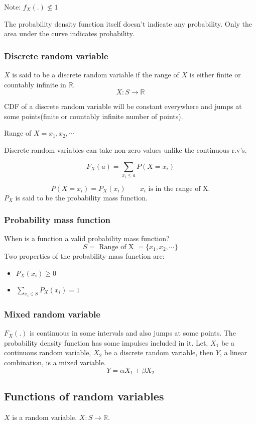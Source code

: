 \documentclass{article}
\begin{document}
Note: $f_X(.) \nleq 1$

The probability density function itself doesn't indicate any probability.
Only the area under the curve indicates probability.

\subsubsection{Discrete random variable}

$X$ is said to be a discrete random variable if the range of $X$ is either finite or countably infinite in $\mathbb{R}$.
$$ X:S \to \mathbb{R}$$

CDF of a discrete random variable will be constant everywhere and jumps at some points(finite or countably infinite number of points).

Range of $X={x_1,x_2,\cdots}$

Discrete random variables can take non-zero values unlike the continuous r.v's.

$$ F_X(a)= \sum_{x_i \leq a}P(X= x_i)$$

$$ P(X=x_i)= P_X(x_i)\qquad x_i \text{ is in the range of X.}$$
$P_X$ is said to be the probability mass function.

\subsubsection{Probability mass function}
When is a function a valid probability mass function?
$$ S= \text{ Range of X }= \{ x_1, x_2, \cdots\}$$
Two properties of the probability mass function are:
\begin{itemize}
    \item $P_X(x_i) \geq 0$

    \item $ \sum_{x_i \in S}P_X(x_i)=1$
\end{itemize}

\subsubsection{Mixed random variable}

$F_X(.)$ is continuous in some intervals and also jumps at some points. The probability density function has some impulses included in it. Let, $X_1$ be a continuous random variable, $X_2$ be a discrete random variable, then $Y$, a linear combination, is a mixed variable.
$$ Y= \alpha X_1 +\beta X_2$$

\subsection{Functions of random variables}
$X$ is a random variable. $X: S \to \mathbb{R}$.
\end{document}
